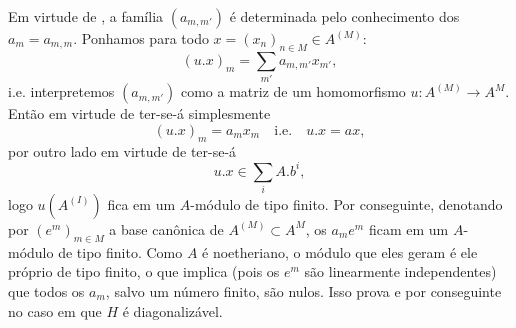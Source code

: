 Em virtude de ,
a família \((a_{m,m'})\) é determinada pelo conhecimento
dos \(a_m=a_{m,m}\). Ponhamos para todo
\(x=(x_n)_{n\in M}\in A^{(M)}\):
\[
  (u.x)_m=\sum_{m'}a_{m,m'}x_{m'},
\]
i.e. interpretemos \((a_{m,m'})\) como a matriz de um
homomorfismo \(u:A^{(M)}\to A^M\). Então em virtude de
 ter-se-á simplesmente
\[
  (u.x)_m=a_mx_m\quad\text{i.e.}\quad u.x=ax,
\]
por outro lado em virtude de
 ter-se-á
\[
  u.x\in\sum_i A.b^i,
\]
logo \(u(A^{(I)})\) fica em um \(A\)-módulo de tipo
finito. Por conseguinte, denotando por \((e^m)_{m\in M}\)
a base canônica de \(A^{(M)}\subset A^M\), os
\(a_me^m\) ficam em um \(A\)-módulo de tipo finito.
Como \(A\) é noetheriano, o módulo que eles geram é ele
próprio de tipo finito, o que implica (pois os \(e^m\)
são linearmente independentes) que todos os \(a_m\),
salvo um número finito, são nulos. Isso prova
 e por conseguinte
 no caso em que
\(H\) é diagonalizável.

